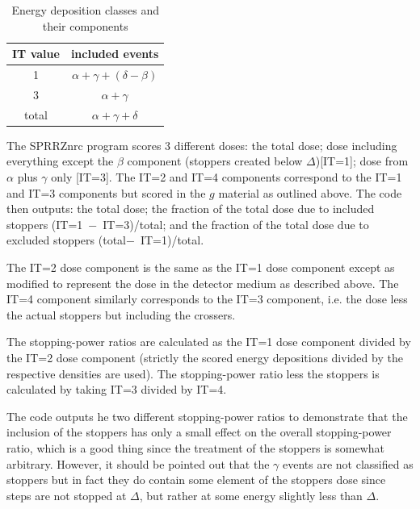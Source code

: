 \documentclass[12pt,twoside]{article}  %
\begin{document}
\begin{table}[htb]
\begin{center}
\caption{Energy deposition classes and their components}
\begin{tabular}{|cc|}
\hline
IT value & included events \\
\hline
1  & $\alpha + \gamma + (\delta -\beta)$ \\
3  & $\alpha + \gamma$\\
total & $\alpha + \gamma + \delta$ \\
\hline
\end{tabular}
\end{center}
\end{table}
The SPRRZnrc program scores 3 different doses: the total dose;
dose including everything except the
$\beta$ component (stoppers created below $\Delta$)[IT=1]; dose from
$\alpha$ plus $\gamma$ only [IT=3].
The IT=2 and IT=4 components
correspond to the IT=1 and IT=3 components but scored in the $g$ material
as outlined above. The code then outputs: the total dose; the
fraction of the total dose due to included stoppers (IT=1~$-$~IT=3)/total;
and the fraction of the total dose due to excluded stoppers
(total$-$~IT=1)/total.

The IT=2 dose component is the same as the IT=1 dose component except as
modified to represent the dose in the detector medium as described above.
The IT=4 component similarly corresponds to the IT=3 component, i.e. the
dose less the actual stoppers but including the crossers.

The stopping-power ratios are calculated as the IT=1 dose component divided
by the IT=2 dose component (strictly the scored energy depositions divided
by the respective densities are used).  The stopping-power ratio less the
stoppers is calculated by taking IT=3 divided by IT=4.

The code outputs he two different stopping-power ratios to demonstrate that
the inclusion of the stoppers has only a small effect on the overall
stopping-power ratio, which is a good thing since the treatment of the
stoppers is somewhat arbitrary.  However, it should be pointed out that the
$\gamma$ events are not classified as stoppers but in fact they do contain
some element of the stoppers dose since steps are not stopped at $\Delta$,
but rather at some energy slightly less than $\Delta$.



\end{document}
